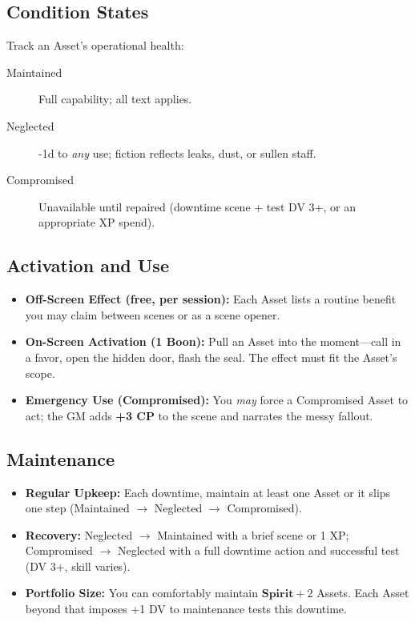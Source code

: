 \begin{multicols}{2}
\subsection*{Condition States}
Track an Asset’s operational health:
\begin{description}
  \item[Maintained] Full capability; all text applies.
  \item[Neglected] -1d to \emph{any} use; fiction reflects leaks, dust, or sullen staff.
  \item[Compromised] Unavailable until repaired (downtime scene + test DV 3+, or an appropriate XP spend).
\end{description}

\subsection*{Activation and Use}
\begin{itemize}
  \item \textbf{Off-Screen Effect (free, per session):} Each Asset lists a routine benefit you may claim between scenes or as a scene opener.
  \item \textbf{On-Screen Activation (1 Boon):} Pull an Asset into the moment—call in a favor, open the hidden door, flash the seal. The effect must fit the Asset’s scope.
  \item \textbf{Emergency Use (Compromised):} You \emph{may} force a Compromised Asset to act; the GM adds \textbf{+3 CP} to the scene and narrates the messy fallout.
\end{itemize}

\subsection*{Maintenance}
\begin{itemize}
  \item \textbf{Regular Upkeep:} Each downtime, maintain at least one Asset or it slips one step (Maintained \(\rightarrow\) Neglected \(\rightarrow\) Compromised).
  \item \textbf{Recovery:} Neglected \(\rightarrow\) Maintained with a brief scene or 1 XP; Compromised \(\rightarrow\) Neglected with a full downtime action and successful test (DV 3+, skill varies).
  \item \textbf{Portfolio Size:} You can comfortably maintain \(\textbf{Spirit} + 2\) Assets. Each Asset beyond that imposes +1 DV to maintenance tests this downtime. 
\end{itemize}


\end{multicols}
